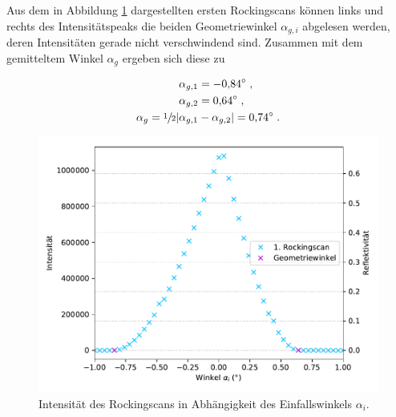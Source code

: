 Aus dem in Abbildung \ref{fig:plot3} dargestellten ersten Rockingscans
können links und rechts des Intensitätspeaks die beiden Geometriewinkel $\alpha_{g,i}$
abgelesen werden, deren Intensitäten gerade nicht verschwindend sind. 
Zusammen mit dem gemitteltem Winkel $\alpha_g$ ergeben sich diese zu

\begin{align*}
    \alpha_{g,1} &= \SI{-0.84}{\degree} \; , \\
    \alpha_{g,2} &= \SI{0.64}{\degree} \; , \\
    \alpha_{g} = \sfrac{1}{2}|\alpha_{g,1} &- \alpha_{g,2}| = \SI{0.74}{\degree} \; .
\end{align*}

\begin{figure}[H]
    \centering
    \includegraphics[scale=0.7]{content/plot3.pdf}
    \vspace{-10pt}
    \caption{Intensität des Rockingscans in Abhängigkeit des Einfallswinkels $\alpha_i$.}
    \label{fig:plot3}
\end{figure}


